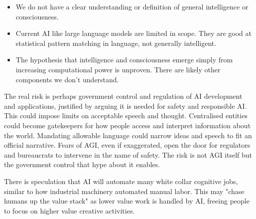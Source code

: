 \begin{itemize}
\item We do not have a clear understanding or definition of general intelligence or consciousness.
\item Current AI like large language models are limited in scope. They are good at statistical pattern matching in language, not generally intelligent.
\item The hypothesis that intelligence and consciousness emerge simply from increasing computational power is unproven. There are likely other components we don't understand.
\end{itemize}

The real risk is perhaps government control and regulation of AI development and applications, justified by arguing it is needed for safety and responsible AI. This could impose limits on acceptable speech and thought. Centralised entities could become gatekeepers for how people access and interpret information about the world. Mandating allowable language could narrow ideas and speech to fit an official narrative. Fears of AGI, even if exaggerated, open the door for regulators and bureaucrats to intervene in the name of safety. The risk is not AGI itself but the government control that hype about it enables.

There is speculation that AI will automate many white collar cognitive jobs, similar to how industrial machinery automated manual labor. This may "chase humans up the value stack" as lower value work is handled by AI, freeing people to focus on higher value creative activities.